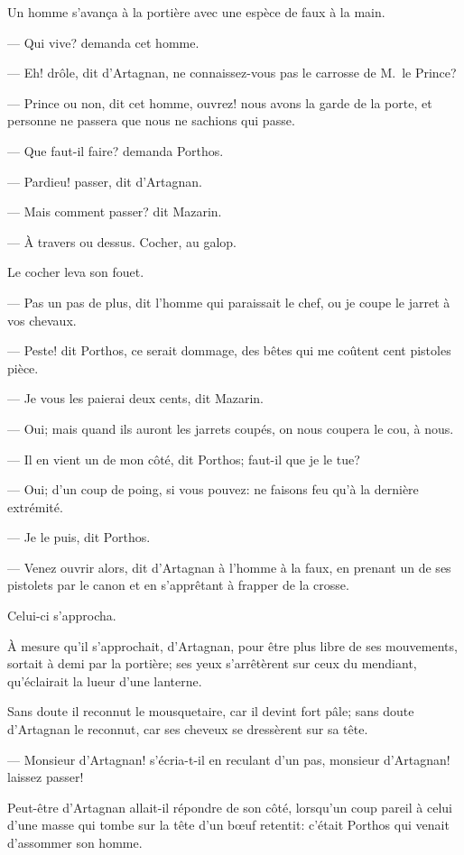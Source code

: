Un homme s'avança à la portière avec une espèce de faux à la main.

— Qui vive? demanda cet homme.

— Eh! drôle, dit d'Artagnan, ne connaissez-vous pas le carrosse de M.~le Prince?

— Prince ou non, dit cet homme, ouvrez! nous avons la garde de la porte, et personne ne passera que nous ne sachions qui passe.

— Que faut-il faire? demanda Porthos.

— Pardieu! passer, dit d'Artagnan.

— Mais comment passer? dit Mazarin.

— À travers ou dessus. Cocher, au galop.

Le cocher leva son fouet.

— Pas un pas de plus, dit l'homme qui paraissait le chef, ou je coupe le jarret à vos chevaux.

— Peste! dit Porthos, ce serait dommage, des bêtes qui me coûtent cent pistoles pièce.

— Je vous les paierai deux cents, dit Mazarin.

— Oui; mais quand ils auront les jarrets coupés, on nous coupera le cou, à nous.

— Il en vient un de mon côté, dit Porthos; faut-il que je le tue?

— Oui; d'un coup de poing, si vous pouvez: ne faisons feu qu'à la dernière extrémité.

— Je le puis, dit Porthos.

— Venez ouvrir alors, dit d'Artagnan à l'homme à la faux, en prenant un de ses pistolets par le canon et en s'apprêtant à frapper de la crosse.

Celui-ci s'approcha.

À mesure qu'il s'approchait, d'Artagnan, pour être plus libre de ses mouvements, sortait à demi par la portière; ses yeux s'arrêtèrent sur ceux du mendiant, qu'éclairait la lueur d'une lanterne.

Sans doute il reconnut le mousquetaire, car il devint fort pâle; sans doute d'Artagnan le reconnut, car ses cheveux se dressèrent sur sa tête.

— Monsieur d'Artagnan! s'écria-t-il en reculant d'un pas, monsieur d'Artagnan! laissez passer!

Peut-être d'Artagnan allait-il répondre de son côté, lorsqu'un coup pareil à celui d'une masse qui tombe sur la tête d'un bœuf retentit: c'était Porthos qui venait d'assommer son homme.

